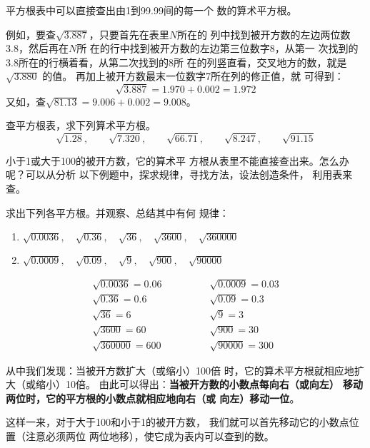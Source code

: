 平方根表中可以直接查出由1到99.99间的每一个
数的算术平方根。

例如，要查$\sqrt{3.887}$，只要首先在表里$N$所在的
列中找到被开方数的左边两位数3.8，然后再在$N$所
在的行中找到被开方数的左边第三位数字8，从第一
次找到的3.8所在的行横着看，从第二次找到的8所
在的列竖直看，交叉地方的数，就是$\sqrt{3.880}$ 的值。
再加上被开方数最末一位数字7所在列的修正值，就
可得到：
\[\sqrt{3.887}=1.970+0.002=1.972\]
又如，查$\sqrt{81.13}=9.006+0.002=9.008$。 

\begin{ex}
    查平方根表，求下列算术平方根。
\[\sqrt{1.28},\qquad \sqrt{7.320},\qquad \sqrt{66.71},\qquad \sqrt{8.247},\qquad \sqrt{91.15} \]
\end{ex}

小于1或大于100的被开方数，它的算术平
方根从表里不能直接查出来。怎么办呢？可以从分析
以下例题中，探求规律，寻找方法，设法创造条件，
利用表来查。


\begin{example}
    求出下列各平方根。并观察、总结其中有何
规律：
\begin{enumerate}
    \item $\sqrt{0.0036},\quad \sqrt{0.36},\quad \sqrt{36},\quad \sqrt{3600},\quad \sqrt{360000}$
    \item $\sqrt{0.0009},\quad \sqrt{0.09},\quad \sqrt{9},\quad \sqrt{900},\quad \sqrt{90000} $
\end{enumerate}
\end{example}

\begin{solution}
\[\begin{array}{ll}
    \sqrt{0.0036}=0.06\qquad \qquad  &  \sqrt{0.0009}=0.03 \\
     \sqrt{0.36}=0.6 &  \sqrt{0.09}=0.3\\
      \sqrt{36}=6 & \sqrt{9}=3 \\
      \sqrt{3600}=60 &  \sqrt{900}=30 \\
       \sqrt{360000}=600 &  \sqrt{90000} =300
\end{array}\]
\end{solution}

从中我们发现：当被开方数扩大（或缩小）100倍
时，它的算术平方根就相应地扩大（或缩小）10倍。
由此可以得出：\textbf{当被开方数的小数点每向右（或向左）
移动两位时，它的平方根的小数点就相应地向右（或
向左）移动一位}。

这样一来，对于大于100和小于1的被开方数，
我们就可以首先移动它的小数点位置（注意必须两位
两位地移），使它成为表内可以查到的数。

